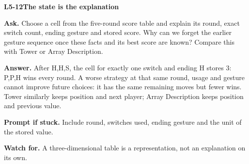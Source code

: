 \documentclass[11pt,a4paper]{article}
\begin{document}
\noindent\begin{minipage}{\textwidth}
{\color{teal}\textbf{L5-12}}\quad \textbf{The state is the explanation}\par\smallskip
\textbf{Ask.} Choose a cell from the five-round score table and explain its round, exact switch count, ending gesture and stored score. Why can we forget the earlier gesture sequence once these facts and its best score are known? Compare this with Tower or Array Description.\par\smallskip
\textbf{Answer.} After H,H,S, the cell for exactly one switch and ending H stores 3: P,P,H wins every round. A worse strategy at that same round, usage and gesture cannot improve future choices: it has the same remaining moves but fewer wins. Tower similarly keeps position and next player; Array Description keeps position and previous value.\par\smallskip
\textbf{Prompt if stuck.} Include round, switches used, ending gesture and the unit of the stored value.\par\smallskip
\textbf{Watch for.} A three-dimensional table is a representation, not an explanation on its own.
\end{minipage}\par{}\medskip
\end{document}
